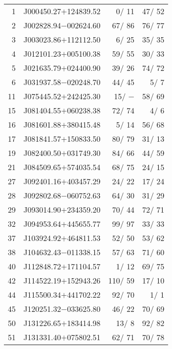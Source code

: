 \documentclass[twocolumn]{aastex62}
\begin{document}
\begin{table}
\begin{minipage}{85mm}
{\begin{tabular}{@{} r c r  r  @{}}
  1   &J000450.27$+$124839.52 &       0/  11    &      47/   52   \\ 
  2   &J002828.94$-$002624.60 &      67/  86    &      76/   77   \\ 
  3   &J003023.86$+$112112.50 &       6/  25    &      35/   35   \\4   &J012101.23$+$005100.38 &      59/  55    &      30/   33   \\
  5   &J021635.79$+$024400.90 &      39/  26    &      74/   72   \\    
  6   &J031937.58$-$020248.70 &      44/  45    &       5/    7   \\ 
 11   &J075445.52$+$242425.30 &      15/  $-$   &      58/   69   \\ 
 15   &J081404.55$+$060238.38 &      72/  74    &       4/    6   \\ 
 16   &J081601.88$+$380415.48 &       5/  14    &      56/   68   \\ 
 17   &J081841.57$+$150833.50 &      80/  79    &      31/   13   \\ 
 19   &J082400.50$+$031749.30 &      84/  66    &      44/   59   \\ 
 21   &J084509.65$+$574035.54 &      68/  75    &      24/   15   \\ 
 27   &J092401.16$+$403457.29 &      24/  22    &      17/   24   \\ 
 28   &J092802.68$-$060752.63 &      64/  30    &      31/   29   \\ 
 29   &J093014.90$+$234359.20 &      70/  44    &      72/   71   \\ 
 32   &J094953.64$+$445655.77 &      99/  97    &      33/   33   \\ 
 37   &J103924.92$+$464811.53 &      52/  50    &      53/   62   \\ 
 38   &J104632.43$-$011338.15 &      57/  63    &      71/   60   \\
 40   &J112848.72$+$171104.57 &       1/  12    &      69/   75   \\ 
 42   &J114522.19$+$152943.26 &     110/  59    &      17/   10   \\ 
 44   &J115500.34$+$441702.22 &      92/  70    &       1/    1   \\ 
 45   &J120251.32$-$033625.80 &      46/  22    &      70/   69   \\ 
 50   &J131226.65$+$183414.98 &      13/   8    &      92/   82   \\ 
 51   &J131331.40$+$075802.51 &      62/  71    &      70/   78   \\

\end{tabular}}
\end{minipage}
\end{table}
\end{document}

